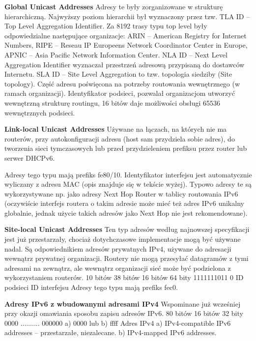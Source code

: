     \textbf{Global Unicast Addresses}
    Adresy te były zorganizowane w strukturę hierarchiczną.
    Najwyższy poziom hierarchii był wyznaczony przez tzw. TLA ID – Top Level Aggregation
    Identifier. Za 8192 trasy typu top level były odpowiedzialne następujące organizacje:
    ARIN – American Registry for Internet Numbers,
    RIPE – Reseau IP Europeens Network Coordinator Center in Europe,
    APNIC – Asia Pacific Network Information Center.
    NLA ID – Next Level Aggregation Identifier wyznaczał przestrzeń adresową przypisaną do
    dostawców Internetu.
    SLA ID – Site Level Aggregation to tzw. topologia siedziby (Site topology). Część adresu
    poświęcona na potrzeby routowania wewnętrznego (w ramach organizacji). Identyfikator
    podsieci, pozwalał organizacjom utworzyć wewnętrzną strukturę routingu, 16 bitów daje
    możliwości obsługi 65536 wewnętrznych podsieci.


    \textbf{Link-local Unicast Addresses}
    Używane na łączach, na których nie ma routerów, przy autokonfiguracji adresu (host sam
    przydziela sobie adres), do tworzenia sieci tymczasowych lub przed przydzieleniem prefiksu
    przez router lub serwer DHCPv6.

    Adresy tego typu mają prefiks fe80/10. Identyfikator interfejsu jest automatycznie wyliczany
    z adresu MAC (opis znajduje się w tekście wyżej). Typowo adresy te są wykorzystywane np.
    jako adresy Next Hop Router w tablicy routowania IPv6 (oczywiście interfejs routera o takim
    adresie może mieć też adres IPv6 unikalny globalnie, jednak użycie takich adresów jako Next
    Hop nie jest rekomendowane).

    \textbf{Site-local Unicast Addresses}
    Ten typ adresów według najnowszej specyfikacji jest już przestarzały, chociaż dotychczasowe
    implementacje mogą być używane nadal. Są odpowiednikiem adresów prywatnych IPv4,
    używane do adresacji wewnątrz prywatnej organizacji. Routery nie mogą przesyłać
    datagramów z tymi adresami na zewnątrz, ale wewnątrz organizacji sieć może być
    podzielona z wykorzystaniem routerów.
    10 bitów 38 bitów 16 bitów 64 bity
    1111111011 0 ID podsieci ID interfejsu
    Adresy tego typu mają prefiks fec0.

    \textbf{Adresy IPv6 z wbudowanymi adresami IPv4}
    Wspominane już wcześniej przy okazji omawiania sposobu zapisu adresów IPv6.
    80 bitów 16 bitów 32 bity
    0000 .......... 000000 a) 0000 lub
    b) ffff
    Adres IPv4
    a) IPv4-compatible IPv6 addresses – przestarzałe, niezalecane.
    b) IPv4-mapped IPv6 addresses.


